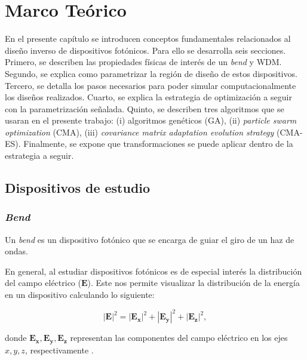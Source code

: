 \chapter{Marco  Teórico}

En el presente capítulo se introducen conceptos fundamentales relacionados al diseño inverso de dispositivos fotónicos.
Para ello se desarrolla seis secciones. 
Primero, se describen las propiedades físicas de interés de un \emph{bend} y WDM.
Segundo, se explica como parametrizar la región de diseño de estos
dispositivos.
Tercero, se detalla los pasos necesarios para poder simular computacionalmente
los diseños realizados.
Cuarto, se explica la estrategia de optimización a seguir con la
parametrización señalada.
Quinto, se describen tres algoritmos que se usaran en el presente trabajo: (i)
algoritmos genéticos (GA), (ii) \emph{particle swarm optimization} (CMA), (iii)
\emph{covariance matrix adaptation evolution strategy} (CMA-ES).
Finalmente, se expone que transformaciones se puede aplicar dentro de la
estrategia a seguir.


\section{Dispositivos de estudio}

\subsection{\emph{Bend}}

Un \emph{bend} es un dispositivo fotónico que se encarga de guiar el giro de un haz de ondas.

En general, al estudiar dispositivos fotónicos es de especial interés la
distribución del campo eléctrico ($\boldsymbol{E}$).
Este nos permite visualizar la distribución de la energía en un dispositivo calculando lo siguiente:

\begin{equation}
  |\boldsymbol{E}|^2 = |\boldsymbol{E_x}|^2+|\boldsymbol{E_y}|^2+|\boldsymbol{E_z}|^2,
\label{eq:field}
\end{equation}

donde $\boldsymbol{E_x}, \boldsymbol{E_y}, \boldsymbol{E_z}$ representan las componentes del campo eléctrico
en los ejes $x, y, z$, respectivamente
\citep{LukasChrostowski2010}.


